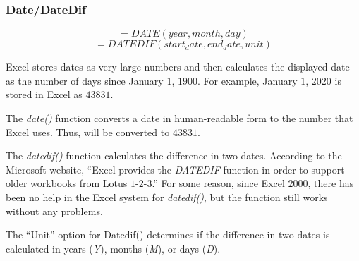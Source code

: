 \subsubsection{Date/DateDif}

\[ =DATE(year, month, day) \]
\[ =DATEDIF (start_date, end_date, unit) \]

Excel stores dates as very large numbers and then calculates the displayed date as the number of days since January $ 1 $, $ 1900 $. For example, January $ 1 $, $ 2020 $ is stored in Excel as $ 43831 $. 

The \textit{date()} function converts a date in human-readable form to the number that Excel uses. Thus,  will be converted to $ 43831 $.

The \textit{datedif()} function calculates the difference in two dates. According to the Microsoft website, ``Excel provides the \textit{DATEDIF} function in order to support older workbooks from Lotus $ 1 $-$ 2 $-$ 3 $.'' For some reason, since Excel $ 2000 $, there has been no help in the Excel system for \textit{datedif()}, but the function still works without any problems. 

The ``Unit'' option for Datedif() determines if the difference in two dates is calculated in years (\textit{Y}), months (\textit{M}), or days (\textit{D}).

